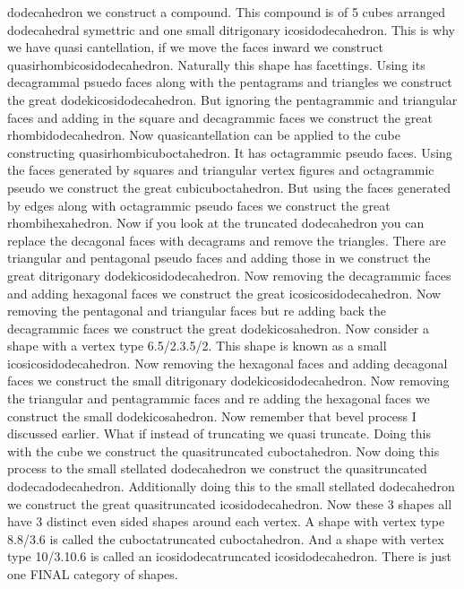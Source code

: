 \documentclass{article}
\begin{document}
dodecahedron we construct a compound. This compound is of 5 cubes arranged dodecahedral symettric and one small ditrigonary icosidodecahedron.  This is why we have quasi cantellation, if we move the faces inward we construct quasirhombicosidodecahedron. Naturally this shape has facettings. Using its decagrammal psuedo faces along with the pentagrams and triangles we construct the great dodekicosidodecahedron. But ignoring the pentagrammic and triangular faces and adding in the square and decagrammic faces we construct the great rhombidodecahedron. Now quasicantellation can be applied to the cube constructing quasirhombicuboctahedron. It has octagrammic pseudo faces. Using the faces generated by squares and triangular vertex figures and octagrammic pseudo we construct the great cubicuboctahedron. But using the faces generated by edges along with octagrammic pseudo faces we construct the great rhombihexahedron. Now if you look at the truncated dodecahedron you can replace the decagonal faces with decagrams and remove the triangles. There are triangular and pentagonal pseudo faces and adding those in we construct the great ditrigonary dodekicosidodecahedron. Now removing the decagrammic faces and adding hexagonal faces we construct the great icosicosidodecahedron.  Now removing the pentagonal and triangular faces but re adding back the decagrammic faces we construct the great dodekicosahedron. Now consider a shape with a vertex type 6.5/2.3.5/2. This shape is known as a small icosicosidodecahedron. Now removing the hexagonal faces and adding decagonal faces we construct the small ditrigonary dodekicosidodecahedron. Now removing the triangular and pentagrammic faces and re adding the hexagonal faces we construct the small dodekicosahedron.  Now remember that bevel process I discussed earlier. What if instead of truncating we quasi truncate. Doing this with the cube we construct the quasitruncated cuboctahedron. Now doing this process to the small stellated dodecahedron we construct the quasitruncated dodecadodecahedron. Additionally doing this to the small stellated dodecahedron we construct the great quasitruncated icosidodecahedron. Now these 3 shapes all have 3 distinct even sided shapes around each vertex. A shape with vertex type 8.8/3.6 is called the cuboctatruncated cuboctahedron. And a shape with vertex type 10/3.10.6 is called an icosidodecatruncated icosidodecahedron. There is just one FINAL category of shapes.
\end{document}
